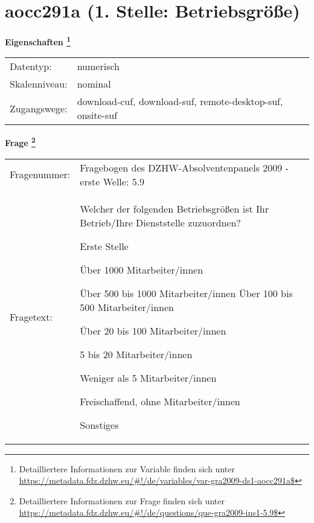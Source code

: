 
    \setcounter{footnote}{0}

    \vspace*{-1.8cm}
	\section{aocc291a (1. Stelle: Betriebsgröße)}
	\label{section:aocc291a}



    \vspace*{0.5cm}
    \noindent\textbf{Eigenschaften
	\footnote{Detailliertere Informationen zur Variable finden sich unter
		\url{https://metadata.fdz.dzhw.eu/\#!/de/variables/var-gra2009-ds1-aocc291a$}}}\\
	\begin{tabularx}{\hsize}{@{}lX}
	Datentyp: & numerisch \\
	Skalenniveau: & nominal \\
	Zugangswege: &
	  download-cuf, 
	  download-suf, 
	  remote-desktop-suf, 
	  onsite-suf
 \\
    \end{tabularx}



				\vspace*{0.5cm}
                \noindent\textbf{Frage
	                \footnote{Detailliertere Informationen zur Frage finden sich unter
		              \url{https://metadata.fdz.dzhw.eu/\#!/de/questions/que-gra2009-ins1-5.9$}}}\\
				\begin{tabularx}{\hsize}{@{}lX}
					Fragenummer: &
					  Fragebogen des DZHW-Absolventenpanels 2009 - erste Welle:
					  5.9
 \\
					Fragetext: & Welcher der folgenden Betriebsgrößen ist Ihr Betrieb/Ihre Dienststelle zuzuordnen?\par  Erste Stelle\par  Über 1000 Mitarbeiter/innen\par  Über 500 bis 1000 Mitarbeiter/innen Über 100 bis 500 Mitarbeiter/innen\par  Über 20 bis 100 Mitarbeiter/innen\par  5 bis 20 Mitarbeiter/innen\par  Weniger als 5 Mitarbeiter/innen\par  Freischaffend, ohne Mitarbeiter/innen\par  Sonstiges \\
				\end{tabularx}





